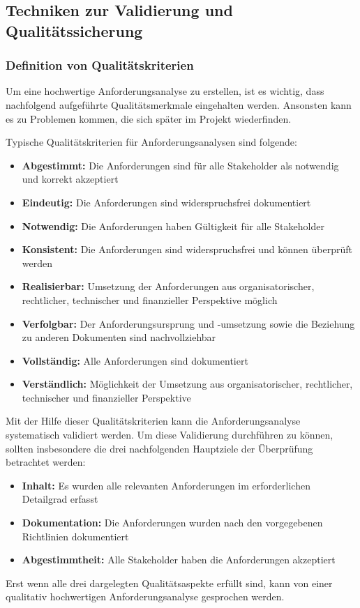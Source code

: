 \subsection{Techniken zur Validierung und Qualitätssicherung}
\subsubsection{Definition von Qualitätskriterien}
Um eine hochwertige Anforderungsanalyse zu erstellen, ist es wichtig, dass nachfolgend aufgeführte Qualitätsmerkmale eingehalten werden.
Ansonsten kann es zu Problemen kommen, die sich später im Projekt wiederfinden.

Typische Qualitätskriterien für Anforderungsanalysen sind folgende:
\begin{itemize}
    \item \textbf{Abgestimmt:} Die Anforderungen sind für alle Stakeholder als notwendig und korrekt akzeptiert
    \item \textbf{Eindeutig:} Die Anforderungen sind widerspruchsfrei dokumentiert
    \item \textbf{Notwendig:} Die Anforderungen haben Gültigkeit für alle Stakeholder
    \item \textbf{Konsistent:} Die Anforderungen sind widerspruchsfrei und können überprüft werden
    \item \textbf{Realisierbar:} Umsetzung der Anforderungen aus organisatorischer, rechtlicher, technischer und finanzieller Perspektive möglich
    \item \textbf{Verfolgbar:} Der Anforderungsursprung und -umsetzung sowie die Beziehung zu anderen Dokumenten sind nachvollziehbar
    \item \textbf{Vollständig:} Alle Anforderungen sind dokumentiert
    \item \textbf{Verständlich:} Möglichkeit der Umsetzung aus organisatorischer, rechtlicher, technischer und finanzieller Perspektive
\end{itemize}\autocite[vgl.][Seite 44]{Maulhardt.b}

Mit der Hilfe dieser Qualitätskriterien kann die Anforderungsanalyse systematisch validiert werden.
Um diese Validierung durchführen zu können, sollten insbesondere die drei nachfolgenden Hauptziele der Überprüfung betrachtet werden:
\begin{itemize}
    \item \textbf{Inhalt:} Es wurden alle relevanten Anforderungen im erforderlichen Detailgrad erfasst
    \item \textbf{Dokumentation:} Die Anforderungen wurden nach den vorgegebenen Richtlinien dokumentiert
    \item \textbf{Abgestimmtheit:} Alle Stakeholder haben die Anforderungen akzeptiert
\end{itemize}
Erst wenn alle drei dargelegten Qualitätsaspekte erfüllt sind, kann von einer qualitativ hochwertigen Anforderungsanalyse gesprochen werden\autocite[vgl.][Seite 16ff]{Maulhardt.c}.

